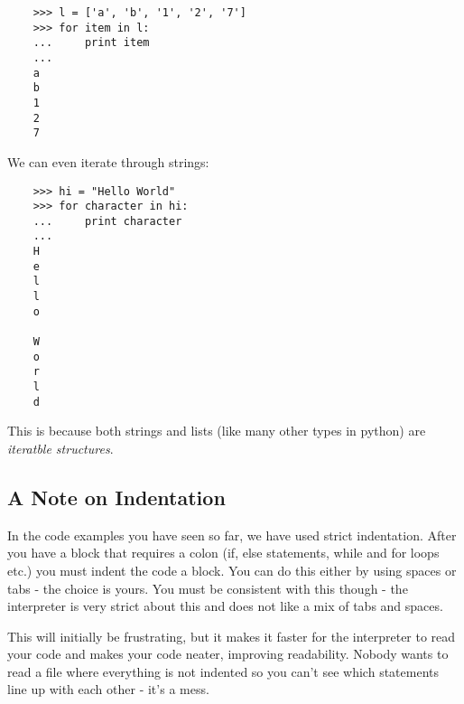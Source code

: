 \begin{lstlisting}
    >>> l = ['a', 'b', '1', '2', '7']
    >>> for item in l:
    ...     print item
    ...
    a
    b
    1
    2
    7
\end{lstlisting}

We can even iterate through strings:

\begin{lstlisting}
    >>> hi = "Hello World"
    >>> for character in hi:
    ...     print character
    ...
    H
    e
    l
    l
    o

    W
    o
    r
    l
    d
\end{lstlisting}

This is because both strings and lists (like many other types in python) are
\emph{iteratble structures}.

\subsection{A Note on Indentation}

In the code examples you have seen so far, we have used strict indentation.
After you have a block that requires a colon (if, else statements, while and for
loops etc.) you must indent the code a block. You can do this either by using
spaces or tabs - the choice is yours. You must be consistent with this though - 
the interpreter is very strict about this and does not like a mix of tabs and
spaces.

This will initially be frustrating, but it makes it faster for the interpreter
to read your code and makes your code neater, improving readability. Nobody
wants to read a file where everything is not indented so you can't see which
statements line up with each other - it's a mess.
